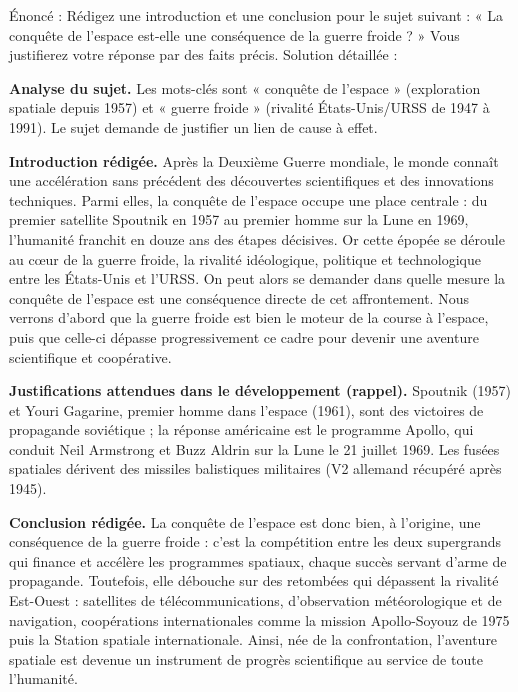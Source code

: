 \documentclass[11pt]{article}
\newcommand{\cle}[1]{{\popxbold\color{popdark}#1}}
\begin{document}
\begin{exoresolu}
Énoncé : Rédigez une introduction et une conclusion pour le sujet suivant : « La conquête de l'espace est-elle une conséquence de la guerre froide ? » Vous justifierez votre réponse par des faits précis.
\tcblower
Solution détaillée :

\textbf{Analyse du sujet.} Les mots-clés sont « conquête de l'espace » (exploration spatiale depuis 1957) et « guerre froide » (rivalité États-Unis/URSS de 1947 à 1991). Le sujet demande de justifier un lien de cause à effet.

\textbf{Introduction rédigée.} Après la Deuxième Guerre mondiale, le monde connaît une accélération sans précédent des découvertes scientifiques et des innovations techniques. Parmi elles, la conquête de l'espace occupe une place centrale : du premier satellite \cle{Spoutnik} en 1957 au premier homme sur la Lune en 1969, l'humanité franchit en douze ans des étapes décisives. Or cette épopée se déroule au cœur de la guerre froide, la rivalité idéologique, politique et technologique entre les États-Unis et l'URSS. On peut alors se demander dans quelle mesure la conquête de l'espace est une conséquence directe de cet affrontement. Nous verrons d'abord que la guerre froide est bien le moteur de la course à l'espace, puis que celle-ci dépasse progressivement ce cadre pour devenir une aventure scientifique et coopérative.

\textbf{Justifications attendues dans le développement (rappel).} \cle{Spoutnik} (1957) et \cle{Youri Gagarine}, premier homme dans l'espace (1961), sont des victoires de propagande soviétique ; la réponse américaine est le programme \cle{Apollo}, qui conduit \cle{Neil Armstrong} et \cle{Buzz Aldrin} sur la Lune le 21 juillet 1969. Les fusées spatiales dérivent des missiles balistiques militaires (V2 allemand récupéré après 1945).

\textbf{Conclusion rédigée.} La conquête de l'espace est donc bien, à l'origine, une conséquence de la guerre froide : c'est la compétition entre les deux supergrands qui finance et accélère les programmes spatiaux, chaque succès servant d'arme de propagande. Toutefois, elle débouche sur des retombées qui dépassent la rivalité Est-Ouest : satellites de télécommunications, d'observation météorologique et de navigation, coopérations internationales comme la mission \cle{Apollo-Soyouz} de 1975 puis la \cle{Station spatiale internationale}. Ainsi, née de la confrontation, l'aventure spatiale est devenue un instrument de progrès scientifique au service de toute l'humanité.
\end{exoresolu}
\end{document}
